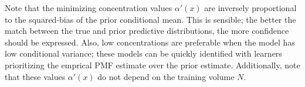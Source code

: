 \documentclass[12pt]{article}
\DeclareMathOperator{\xrm}{\mathrm{x}}
\DeclareMathOperator{\yrm}{\mathrm{y}}
\DeclareMathOperator{\nrm}{\mathrm{n}}
\DeclareMathOperator{\Erm}{\mathrm{E}}
\begin{document}
Note that the minimizing concentration values $\alpha'(x)$ are inversely proportional to the squared-bias of the prior conditional mean. This is sensible; the better the match between the true and prior predictive distributions, the more confidence should be expressed. Also, low concentrations are preferable when the model has low conditional variance; these models can be quickly identified with learners prioritizing the emprical PMF estimate over the prior estimate. Additionally, note that these values $\alpha'(x)$ do not depend on the training volume $N$.



\end{document}
